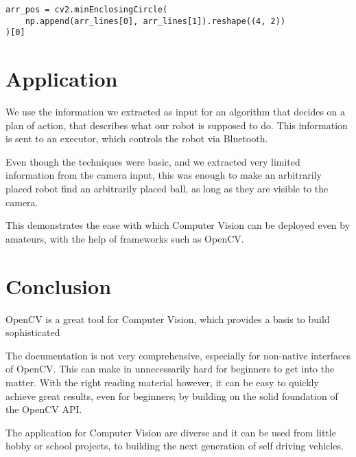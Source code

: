 \documentclass[12pt, a4paper]{article}
\begin{document}
\begin{lstlisting}
arr_pos = cv2.minEnclosingCircle(
    np.append(arr_lines[0], arr_lines[1]).reshape((4, 2))
)[0]
\end{lstlisting}

\section{Application}
We use the information we extracted as input for an algorithm that decides on a plan of action, that describes what our robot is supposed to do. This information is sent to an executor, which controls the robot via Bluetooth.

Even though the techniques were basic, and we extracted very limited information from the camera input, this was enough to make an arbitrarily placed robot find an arbitrarily placed ball, as long as they are visible to the camera.

This demonstrates the ease with which Computer Vision can be deployed even by amateurs, with the help of frameworks such as OpenCV.

\section{Conclusion}
OpenCV is a great tool for Computer Vision, which provides a basis to build sophisticated

The documentation is not very comprehensive, especially for non-native interfaces of OpenCV. This can make in unnecessarily hard for beginners to get into the matter. With the right reading material however, it can be easy to quickly achieve great results, even for beginners; by building on the solid foundation of the OpenCV API.

The application for Computer Vision are diverse and it can be used from little hobby or school projects, to building the next generation of self driving vehicles.
\end{document}
